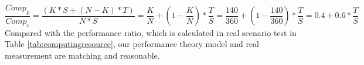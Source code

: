 \begin{equation}
\label{eqn:10}
\frac{Comp_{p}}{Comp_{c}}=\frac{(K*S+(N-K)*T)}{N*S}=\frac{K}{N} + (1 - \frac{K}{N})*\frac{T}{S}=\frac{140}{360} + (1 - \frac{140}{360})*\frac{T}{S} = 0.4 + 0.6*\frac{T}{S}
\end{equation}
Compared with the performance ratio, which is calculated in real scenario test in Table \ref{tab:computingresource}, our performance theory model and real measurement are matching and reasonable.